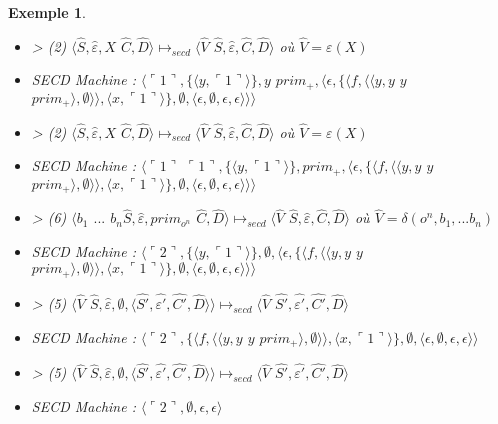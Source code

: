 \documentclass[10pt,a4paper]{report}
\newtheorem{ex}{Exemple}
\begin{document}
\begin{ex}
\begin{itemize}
			\item[] > (2) $\langle\widehat{S},\widehat{\varepsilon},X$ $\widehat{C},\widehat{D}\rangle \longmapsto_{secd} \langle \widehat{V}$ $\widehat{S},\widehat{\varepsilon},\widehat{C},\widehat{D}\rangle$ où $\widehat{V} = \varepsilon(X)$
			\item[] SECD Machine : $\langle\ulcorner 1\urcorner,\{\langle y,\ulcorner 1\urcorner\rangle\},y$ $prim_{+},\langle\epsilon,\{\langle f,\langle\langle y,y$ $y$ $prim_{+}\rangle,\emptyset\rangle\rangle,\langle x,\ulcorner 1\urcorner\rangle\} ,\emptyset,\langle\epsilon,\emptyset,\epsilon,\epsilon\rangle\rangle\rangle$
			\item[] > (2) $\langle\widehat{S},\widehat{\varepsilon},X$ $\widehat{C},\widehat{D}\rangle \longmapsto_{secd} \langle \widehat{V}$ $\widehat{S},\widehat{\varepsilon},\widehat{C},\widehat{D}\rangle$ où $\widehat{V} = \varepsilon(X)$
			\item[] SECD Machine : $\langle\ulcorner 1\urcorner$ $\ulcorner 1\urcorner,\{\langle y,\ulcorner 1\urcorner\rangle\},prim_{+},\langle\epsilon,\{\langle f,\langle\langle y,y$ $y$ $prim_{+}\rangle,\emptyset\rangle\rangle,\langle x,\ulcorner 1\urcorner\rangle\} ,\emptyset,\langle\epsilon,\emptyset,\epsilon,\epsilon\rangle\rangle\rangle$
			\item[] > (6) $\langle b_{1}$ $...$ $b_{n}\widehat{S},\widehat{\varepsilon},prim_{o^{n}}$ $\widehat{C},\widehat{D}\rangle \longmapsto_{secd} \langle \widehat{V}$ $\widehat{S},\widehat{\varepsilon},\widehat{C},\widehat{D}\rangle$ où $\widehat{V} = \delta(o^{n},b_1,...b_{n})$
			\item[] SECD Machine : $\langle\ulcorner 2\urcorner,\{\langle y,\ulcorner 1\urcorner\rangle\},\emptyset,\langle\epsilon,\{\langle f,\langle\langle y,y$ $y$ $prim_{+}\rangle,\emptyset\rangle\rangle,\langle x,\ulcorner 1\urcorner\rangle\} ,\emptyset,\langle\epsilon,\emptyset,\epsilon,\epsilon\rangle\rangle\rangle$
			\item[] > (5) $\langle\widehat{V}$ $\widehat{S},\widehat{\varepsilon},\emptyset,\langle\widehat{S'},\widehat{\varepsilon'},\widehat{C'},\widehat{D}\rangle\rangle \longmapsto_{secd} \langle \widehat{V}$ $\widehat{S'},\widehat{\varepsilon'},\widehat{C'},\widehat{D}\rangle$
			\item[] SECD Machine : $\langle\ulcorner 2\urcorner,\{\langle f,\langle\langle y,y$ $y$ $prim_{+}\rangle,\emptyset\rangle\rangle,\langle x,\ulcorner 1\urcorner\rangle\} ,\emptyset,\langle\epsilon,\emptyset,\epsilon,\epsilon\rangle\rangle$
			\item[] > (5) $\langle\widehat{V}$ $\widehat{S},\widehat{\varepsilon},\emptyset,\langle\widehat{S'},\widehat{\varepsilon'},\widehat{C'},\widehat{D}\rangle\rangle \longmapsto_{secd} \langle \widehat{V}$ $\widehat{S'},\widehat{\varepsilon'},\widehat{C'},\widehat{D}\rangle$
			\item[] SECD Machine : $\langle\ulcorner 2\urcorner,\emptyset,\epsilon,\epsilon\rangle$
		\end{itemize}
	\end{ex}
	\newpage
	
\end{document}
